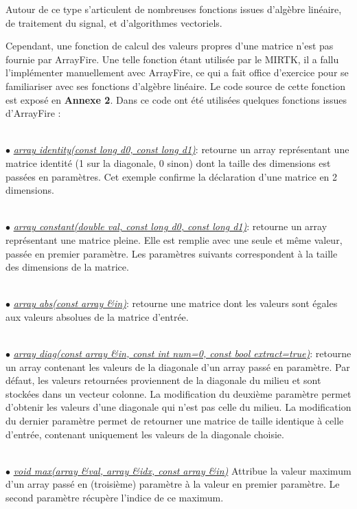 \documentclass[10pt]{report}
\begin{document}
	Autour de ce type s'articulent de nombreuses fonctions issues d'algèbre linéaire, de traitement du signal, et d'algorithmes vectoriels. %
	~\par 
	Cependant, une fonction de calcul des valeurs propres d'une matrice n'est pas fournie par ArrayFire. Une telle fonction étant utilisée par le MIRTK, il a fallu l'implémenter manuellement avec ArrayFire, ce qui a fait office d'exercice pour se familiariser avec ses fonctions d'algèbre linéaire. Le code source de cette fonction est exposé en \textbf{Annexe 2}. Dans ce code ont été utilisées quelques fonctions issues d'ArrayFire :\\~\par
	{$\bullet$} \underline{\textit{array identity(const long d0, const long d1)}}: 
	retourne un array représentant une matrice identité (1 sur la diagonale, 0 sinon) dont la taille des dimensions est passées en paramètres. Cet exemple confirme la déclaration d'une matrice en 2 dimensions.\\~\par
	{$\bullet$} \underline{\textit{array constant(double val, const long d0, const long d1)}}: retourne un array représentant une matrice pleine. Elle est remplie avec une seule et même valeur, passée en premier paramètre. Les paramètres suivants correspondent à la taille des dimensions de la matrice.\\~\par
	{$\bullet$} \underline{\textit{array abs(const array \&in)}}: retourne une matrice dont les valeurs sont égales aux valeurs absolues de la matrice d'entrée.\\~\par
	{$\bullet$} \underline{\textit{array diag(const array \&in, const int num=0, const bool extract=true)}}:
	retourne un array contenant les valeurs de la diagonale d'un array passé en paramètre. Par défaut, les valeurs retournées proviennent de la diagonale du milieu et sont stockées dans un vecteur colonne. La modification du deuxième paramètre permet d'obtenir les valeurs d'une diagonale qui n'est pas celle du milieu. La modification du dernier paramètre permet de retourner une matrice de taille identique à celle d'entrée, contenant uniquement les valeurs de la diagonale choisie.\\~\par
	{$\bullet$} \textit{\underline{void max(array \&val, array \&idx, const array \&in)}} Attribue la valeur maximum d'un array passé en (troisième) paramètre à la valeur en premier paramètre. Le second paramètre récupère l'indice de ce maximum.\\~\par
\end{document}
